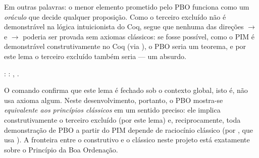     Em outras palavras: o menor elemento prometido pelo PBO funciona
    como um \textit{oráculo} que decide qualquer proposição. Como o
    terceiro excluído não é demonstrável na lógica intuicionista do
    Coq, segue que nenhuma das direções  \ensuremath{\rightarrow}  e  \ensuremath{\rightarrow} 
    poderia ser provada sem axiomas clássicos: se fosse possível,
    como o PIM é demonstrável construtivamente no Coq (via
    ), o PBO seria um teorema, e por este lema o terceiro
    excluído também seria — um absurdo. 
\begin{coqdoccode}
\coqdocemptyline
\coqdocnoindent
{} :   \coqdockw{\ensuremath{\forall}} : ,    .\coqdoceol
\coqdocemptyline
\end{coqdoccode}
O comando    confirma que
    este lema é fechado sob o contexto global, isto é, não usa
    axioma algum. Neste desenvolvimento, portanto, o PBO mostra-se
    \textit{equivalente aos princípios clássicos} em um sentido preciso:
    ele implica construtivamente o terceiro excluído (por este
    lema) e, reciprocamente, toda demonstração de PBO a partir do
    PIM depende de raciocínio clássico (por , que
    usa ). A fronteira entre o construtivo e o clássico neste
    projeto está exatamente sobre o Princípio da Boa Ordenação. 
\begin{coqdoccode}
\coqdocemptyline
\end{coqdoccode}
